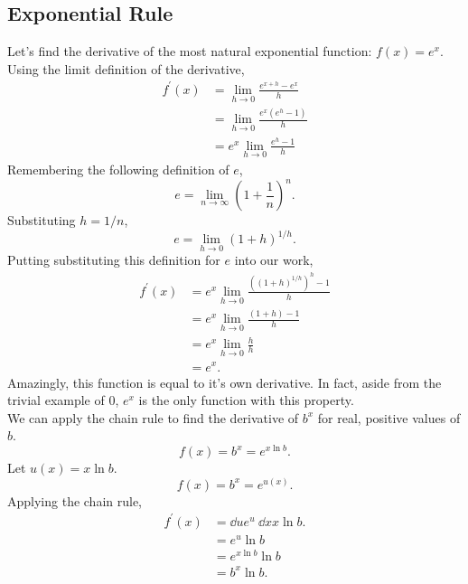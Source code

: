 \subsection{Exponential Rule}
Let's find the derivative of the most natural exponential function: $f(x) = e^x$.
Using the limit definition of the derivative,
\begin{align*}
	f^\prime(x) &= \lim_{h \to 0}{\frac{e^{x+h}-e^x}{h}} \\
	&= \lim_{h \to 0}{\frac{e^x\left(e^h - 1\right)}{h}} \\
	&= e^x \lim_{h \to 0}{\frac{e^h - 1}{h}}
\end{align*}
Remembering the following definition of $e$,
\begin{equation*}
	e = \lim_{n \to \infty}{\left(1+\frac{1}{n}\right)^n}.
\end{equation*}
Substituting $h = 1/n$,
\begin{equation*}
	e = \lim_{h \to 0}{\left(1+h\right)^{1/h}}.
\end{equation*}
Putting substituting this definition for $e$ into our work,
\begin{align*}
	f^\prime(x) &= e^x \lim_{h \to 0}{\frac{\left(\left(1+h\right)^{1/h}\right)^h-1}{h}} \\
	&= e^x \lim_{h \to 0}{\frac{\left(1+h\right)-1}{h}} \\
	&= e^x \lim_{h \to 0}{\frac{h}{h}} \\
	&= e^x.
\end{align*}
Amazingly, this function is equal to it's own derivative. In fact, aside from the trivial example of $0$, $e^x$ is the only function with this property. \\

\noindent
We can apply the chain rule to find the derivative of $b^x$ for real, positive values of $b$.
\begin{equation*}
	f(x) = b^x	= e^{x\ln{b}}.
\end{equation*}
Let $u(x) = x\ln{b}$.
\begin{equation*}
	f(x) = b^x = e^{u(x)}.
\end{equation*}
Applying the chain rule,
\begin{align*}
	f^\prime(x) &= \dd{}{u}e^u \hspace{3pt} \dd{}{x}x\ln{b}. \\
	&= e^u \ln{b} \\
	&= e^{x\ln{b}} \ln{b} \\
	&= b^x \ln{b}.
\end{align*}

